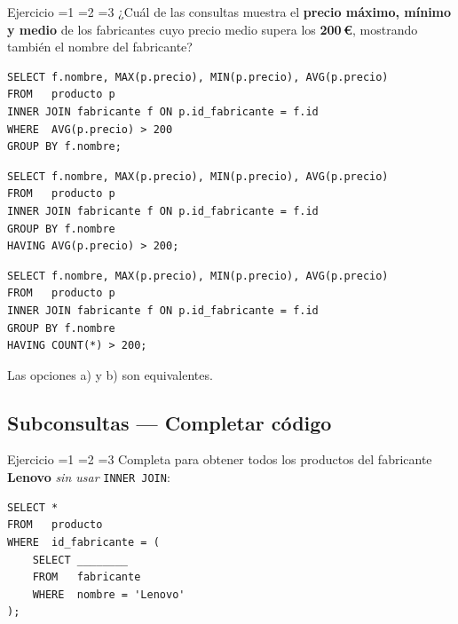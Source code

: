 \documentclass[12pt, a4paper]{article}
\newcommand{\estrella}{{\color{Goldenrod}\faStarSolid}}
\newcommand{\estrellavacia}{{\color{gray!45}\faStarSolid}}
\newcommand{\nivel}[1]{%
  \ifnum#1=1\estrella\estrellavacia\estrellavacia\fi
  \ifnum#1=2\estrella\estrella\estrellavacia\fi
  \ifnum#1=3\estrella\estrella\estrella\fi
}
\newcounter{numej}
\newcommand{\ej}{\stepcounter{numej}\thenumej}
\begin{document}
\begin{ejercicio}{Ejercicio \ej}{\nivel{3}}
¿Cuál de las consultas muestra el \textbf{precio máximo, mínimo y medio}
de los fabricantes cuyo precio medio supera los \textbf{200\,€},
mostrando también el nombre del fabricante?

\begin{opciones}
  \item
\begin{lstlisting}
SELECT f.nombre, MAX(p.precio), MIN(p.precio), AVG(p.precio)
FROM   producto p
INNER JOIN fabricante f ON p.id_fabricante = f.id
WHERE  AVG(p.precio) > 200
GROUP BY f.nombre;
\end{lstlisting}
  \item
\begin{lstlisting}
SELECT f.nombre, MAX(p.precio), MIN(p.precio), AVG(p.precio)
FROM   producto p
INNER JOIN fabricante f ON p.id_fabricante = f.id
GROUP BY f.nombre
HAVING AVG(p.precio) > 200;
\end{lstlisting}
  \item
\begin{lstlisting}
SELECT f.nombre, MAX(p.precio), MIN(p.precio), AVG(p.precio)
FROM   producto p
INNER JOIN fabricante f ON p.id_fabricante = f.id
GROUP BY f.nombre
HAVING COUNT(*) > 200;
\end{lstlisting}
  \item Las opciones a) y b) son equivalentes.
\end{opciones}
\end{ejercicio}

\subsection{Subconsultas — Completar código}

\begin{ejercicio}{Ejercicio \ej}{\nivel{2}}
Completa para obtener todos los productos del fabricante \textbf{Lenovo}
\emph{sin usar} \texttt{INNER JOIN}:

\begin{lstlisting}
SELECT *
FROM   producto
WHERE  id_fabricante = (
    SELECT ________
    FROM   fabricante
    WHERE  nombre = 'Lenovo'
);
\end{lstlisting}
\end{ejercicio}
\end{document}
